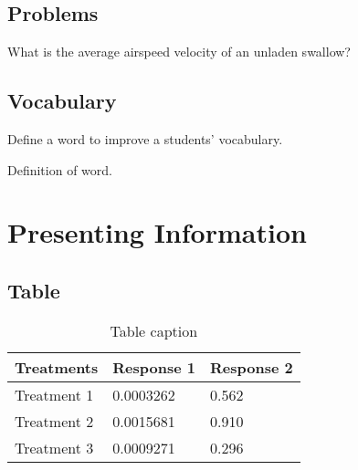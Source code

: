 
\section{Problems}

\begin{problem}
What is the average airspeed velocity of an unladen swallow?
\end{problem}


\section{Vocabulary}

Define a word to improve a students' vocabulary.

\begin{vocabulary}[Word]
  Definition of word.
\end{vocabulary}





\chapter{Presenting Information}

\section{Table}

\begin{table}[h]
  \centering
  \begin{tabular}{l l l}
    \toprule
    \textbf{Treatments} & \textbf{Response 1} & \textbf{Response 2} \\
    \midrule
    Treatment 1         & 0.0003262           & 0.562               \\
    Treatment 2         & 0.0015681           & 0.910               \\
    Treatment 3         & 0.0009271           & 0.296               \\
    \bottomrule
  \end{tabular}
  \caption{Table caption}
\end{table}

